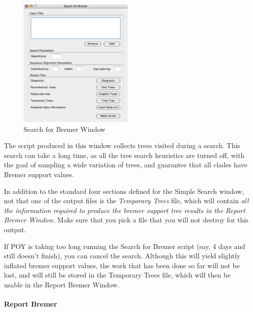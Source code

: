\begin{figure}[htpb]
    \begin{center}
        \includegraphics[width=0.5\textwidth]{figures/SearchForBremer_Window.jpg}
    \end{center}
    \caption{Search for Bremer Window}
    \label{fig:search_for_bremer_window}
\end{figure}

The script produced in this window collects trees visited during a search. This
search can take a long time, as all the tree search heuristics are turned off,
with the goal of sampling a wide variation of trees, and guarantee that all
clades have Bremer support values. 

In addition to the standard four sections defined for the Simple Search window,
not that one of the output files is the \emph{Temporary Trees} file, which will
contain \emph{all the information required to produce the bremer support tree
results in the Report Bremer Window}. Make sure that you pick a file that you
will not destroy for this output.

If POY is taking too long running the Search for Bremer script (say, 4 days and
still doesn't finish), you can cancel the search. Although this will yield
slightly inflated bremer support values, the work that has been done so far will
not be lost, and will still be stored in the Temporary Trees file, which will
then be usable in the Report Bremer Window.

\paragraph{Report Bremer}

